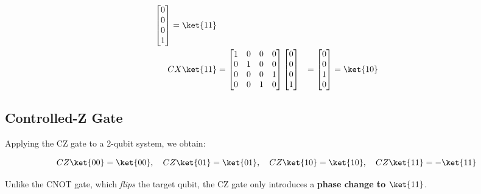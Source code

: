 \begin{equation*}
\begin{aligned}
\begin{bmatrix}
      0 \\ 0 \\ 0 \\ 1
    \end{bmatrix} = \ket{11} \\
    CX \ket{11} & = \begin{bmatrix}
      1 & 0 & 0 & 0 \\
      0 & 1 & 0 & 0 \\
      0 & 0 & 0 & 1 \\
      0 & 0 & 1 & 0
      \end{bmatrix} \begin{bmatrix}
      0 \\ 0 \\ 0 \\ 1
      \end{bmatrix} & = \begin{bmatrix}
      0 \\ 0 \\ 1 \\ 0
    \end{bmatrix} = \ket{10}
  \end{aligned}
\end{equation*}

\subsection*{Controlled-Z Gate}



Applying the CZ gate to a 2-qubit system, we obtain:

\[
  CZ \ket{00} = \ket{00}, \quad
  CZ \ket{01} = \ket{01}, \quad
  CZ \ket{10} = \ket{10}, \quad
  CZ \ket{11} = -\ket{11}
\]

\noindent
Unlike the CNOT gate, which \textit{flips} the target qubit, the CZ gate only
introduces a \textbf{phase change to $\ket{11}$}.

\vspace{0.3cm}

